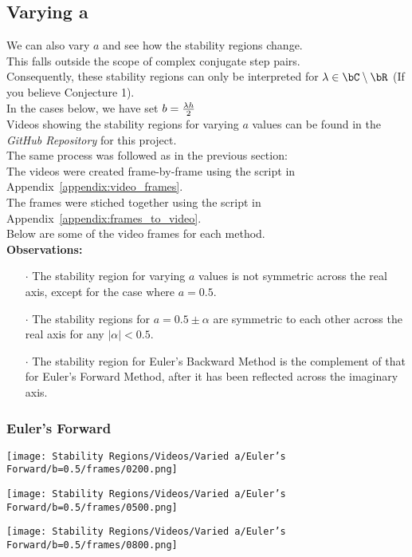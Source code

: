\subsection{Varying a}
\par We can also vary $a$ and see how the stability regions change.\\
This falls outside the scope of complex conjugate step pairs.\\
Consequently, these stability regions can only be interpreted for $\lambda \in \bC\setminus\bR$ (If you believe Conjecture 1).\\
In the cases below, we have set $b = \frac{\lambda h}{2}$\\
Videos showing the stability regions for varying $a$ values can be found in the \textit{GitHub Repository}\cite{GitHub_Repo} for this project.\\
The same process was followed as in the previous section:\\
The videos were created frame-by-frame using the script in Appendix~\ref{appendix:video_frames}.\\
The frames were stiched together using the script in Appendix~\ref{appendix:frames_to_video}.\\
Below are some of the video frames for each method.\\
\textbf{Observations:}
\begin{itemize}
	\item[$\cdot$] The stability region for varying $a$ values is not symmetric across the real axis, except for the case where $a = 0.5$.
	\item[$\cdot$] The stability regions for $a = 0.5 \pm \alpha$ are symmetric to each other across the real axis for any $|\alpha| < 0.5$.
	\item[$\cdot$] The stability region for Euler's Backward Method is the complement of that for Euler's Forward Method, after it has been reflected across the imaginary axis.
\end{itemize}
\subsubsection{Euler's Forward}
\vspace*{-0.65cm}
\begin{multicols}{3}
	\begin{center}
		\texttt{[image: Stability Regions/Videos/Varied a/Euler's Forward/b=0.5/frames/0200.png]}
	\end{center}
	\columnbreak{}
	\begin{center}
		\texttt{[image: Stability Regions/Videos/Varied a/Euler's Forward/b=0.5/frames/0500.png]}
	\end{center}
	\columnbreak{}
	\begin{center}
		\texttt{[image: Stability Regions/Videos/Varied a/Euler's Forward/b=0.5/frames/0800.png]}
	\end{center}
\end{multicols}
